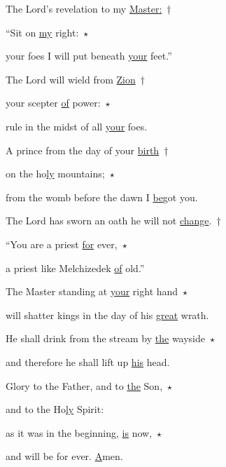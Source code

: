 
\noindent The Lord’s revelation to my \uline{Master:}~†~\nopagebreak

“Sit on \uline{my} right:~$\star$~\nopagebreak

your foes I will put beneath \uline{your} feet.”

\noindent The Lord will wield from \uline{Zion}~†~\nopagebreak

your scepter \uline{of} power:~$\star$~\nopagebreak

rule in the midst of all \uline{your} foes.

\noindent A prince from the day of your \uline{birth}~†~\nopagebreak

on the ho\uline{ly} mountains;~$\star$~\nopagebreak

from the womb before the dawn I \uline{be}got you.

\noindent The Lord has sworn an oath he will not \uline{change}.~†~\nopagebreak

“You are a priest \uline{for} ever,~$\star$~\nopagebreak

a priest like Melchizedek \uline{of} old.”

\noindent The Master standing at \uline{your} right hand~$\star$~\nopagebreak

will shatter kings in the day of his \uline{great} wrath.

\noindent He shall drink from the stream by \uline{the} wayside~$\star$~\nopagebreak

and therefore he shall lift up \uline{his} head.

\noindent Glory to the Father, and to \uline{the} Son,~$\star$~\nopagebreak

and to the Ho\uline{ly} Spirit:

\noindent as it was in the beginning, \uline{is} now,~$\star$~\nopagebreak

and will be for ever. \uline{A}men.
